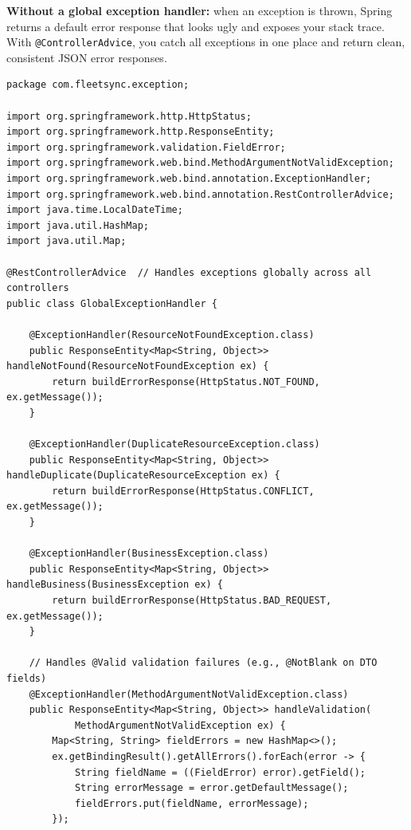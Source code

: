 \documentclass[12pt,a4paper]{report}
\newcommand{\code}[1]{\texttt{\textcolor{keywordblue}{#1}}}
\begin{document}
\begin{tcolorbox}[notebox]
\textbf{Without a global exception handler:} when an exception is thrown, Spring returns a default error response that looks ugly and exposes your stack trace. With \code{@ControllerAdvice}, you catch all exceptions in one place and return clean, consistent JSON error responses.
\end{tcolorbox}

\begin{lstlisting}[caption=GlobalExceptionHandler.java]
package com.fleetsync.exception;

import org.springframework.http.HttpStatus;
import org.springframework.http.ResponseEntity;
import org.springframework.validation.FieldError;
import org.springframework.web.bind.MethodArgumentNotValidException;
import org.springframework.web.bind.annotation.ExceptionHandler;
import org.springframework.web.bind.annotation.RestControllerAdvice;
import java.time.LocalDateTime;
import java.util.HashMap;
import java.util.Map;

@RestControllerAdvice  // Handles exceptions globally across all controllers
public class GlobalExceptionHandler {

    @ExceptionHandler(ResourceNotFoundException.class)
    public ResponseEntity<Map<String, Object>> handleNotFound(ResourceNotFoundException ex) {
        return buildErrorResponse(HttpStatus.NOT_FOUND, ex.getMessage());
    }

    @ExceptionHandler(DuplicateResourceException.class)
    public ResponseEntity<Map<String, Object>> handleDuplicate(DuplicateResourceException ex) {
        return buildErrorResponse(HttpStatus.CONFLICT, ex.getMessage());
    }

    @ExceptionHandler(BusinessException.class)
    public ResponseEntity<Map<String, Object>> handleBusiness(BusinessException ex) {
        return buildErrorResponse(HttpStatus.BAD_REQUEST, ex.getMessage());
    }

    // Handles @Valid validation failures (e.g., @NotBlank on DTO fields)
    @ExceptionHandler(MethodArgumentNotValidException.class)
    public ResponseEntity<Map<String, Object>> handleValidation(
            MethodArgumentNotValidException ex) {
        Map<String, String> fieldErrors = new HashMap<>();
        ex.getBindingResult().getAllErrors().forEach(error -> {
            String fieldName = ((FieldError) error).getField();
            String errorMessage = error.getDefaultMessage();
            fieldErrors.put(fieldName, errorMessage);
        });


\end{lstlisting}
\end{document}

